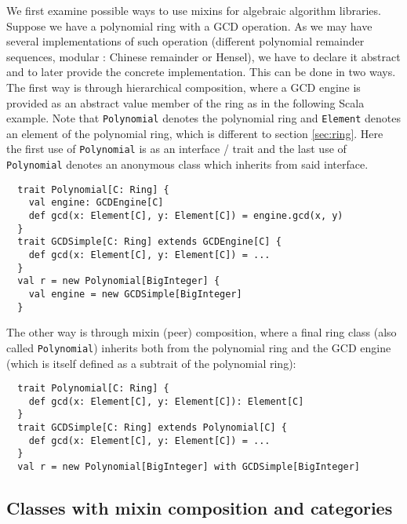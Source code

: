 \documentclass{llncs}
\newcommand{\code}[1]{\texttt{#1}}
\begin{document}
We first examine possible ways to use mixins for algebraic algorithm
libraries.  Suppose we have a polynomial ring with a GCD operation. As
we may have several implementations of such operation (different
polynomial remainder sequences, modular : Chinese remainder or
Hensel), we have to declare it abstract and to later provide the
concrete implementation. This can be done in two ways. The first way
is through hierarchical composition, where a GCD engine is provided as
an abstract value member of the ring as in the following Scala
example. Note that \code{Polynomial} denotes the polynomial ring and
\code{Element} denotes an element of the polynomial ring, which is
different to section \ref{sec:ring}.
Here the first use of \code{Poly\-nomial} is as an interface / trait
and the last use of \code{Poly\-nomial} denotes an anonymous class
which inherits from said interface.
%
\begin{verbatim}
  trait Polynomial[C: Ring] {
    val engine: GCDEngine[C]
    def gcd(x: Element[C], y: Element[C]) = engine.gcd(x, y)
  }
  trait GCDSimple[C: Ring] extends GCDEngine[C] {
    def gcd(x: Element[C], y: Element[C]) = ...
  }
  val r = new Polynomial[BigInteger] {
    val engine = new GCDSimple[BigInteger]
  }
\end{verbatim}
%
The other way is through mixin (peer) composition, where a final
ring class (also called \code{Polynomial}) inherits both from the
polynomial ring and the GCD engine (which is itself defined as a
subtrait of the polynomial ring):
%
\begin{verbatim}
  trait Polynomial[C: Ring] {
    def gcd(x: Element[C], y: Element[C]): Element[C]
  }
  trait GCDSimple[C: Ring] extends Polynomial[C] {
    def gcd(x: Element[C], y: Element[C]) = ...
  }
  val r = new Polynomial[BigInteger] with GCDSimple[BigInteger]
\end{verbatim}


\subsection{Classes with mixin composition and categories} %
\end{document}
